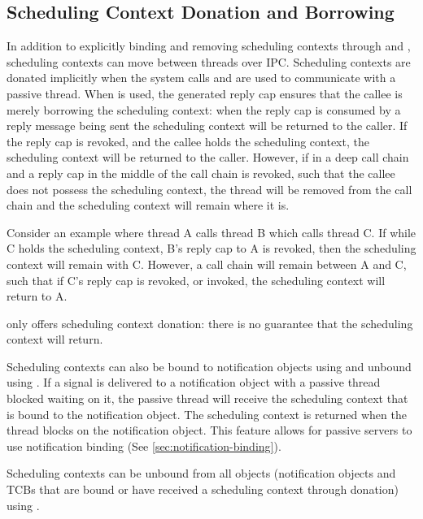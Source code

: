 \subsection{Scheduling Context Donation and Borrowing}

In addition to explicitly binding and removing scheduling contexts through  and , scheduling contexts can move between threads over IPC.
Scheduling contexts are donated implicitly when the system calls  and  are used to communicate with a passive thread.
When  is used, the generated reply cap ensures that the callee is merely borrowing the scheduling context: when the reply cap is consumed by a reply message being sent the scheduling context will be returned to the caller.
If the reply cap is revoked, and the callee holds the scheduling context, the scheduling context will be returned to the caller.
However, if in a deep call chain and a reply cap in the middle of the call chain is revoked, such that the callee does not possess the scheduling context, the thread will be removed from the call chain and the scheduling context will remain where it is.

Consider an example where thread A calls thread B which calls thread C.
If while C holds the scheduling context, B's reply cap to A is revoked, then the scheduling context will remain with C.
However, a call chain will remain between A and C, such that if C's reply cap is revoked, or invoked, the scheduling context will return to A.

 only offers scheduling context donation: there is no guarantee that the scheduling context will return.

Scheduling contexts can also be bound to notification objects using  and unbound using .
If a signal is delivered to a notification object with a passive thread blocked waiting on it, the passive thread will receive the scheduling context that is bound to the notification object.
The scheduling context is returned when the thread blocks on the notification object.
This feature allows for passive servers to use notification binding (See \autoref{sec:notification-binding}).

Scheduling contexts can be unbound from all objects (notification objects and TCBs that are bound or have received a scheduling context through donation) using .

